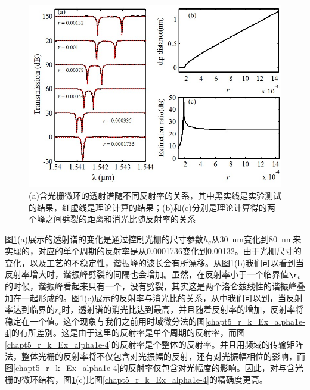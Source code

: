 \begin{figure}[htb]
	\centering
	\includegraphics[width=12cm]{./Pictures/chapt5_ring_grating_vary_reflector.jpg}
	\caption{(a)含光栅微环的透射谱随不同反射率的关系，其中黑实线是实验测试的结果，红虚线是理论计算的结果；(b)和(c)分别是理论计算得的两个峰之间劈裂的距离和消光比随反射率的关系}
	\label{chapt5_ring_grating_vary_reflector}
\end{figure}

图\ref{chapt5_ring_grating_vary_reflector}(a)展示的透射谱的变化是通过控制光栅的尺寸参数$h_g$从30~nm变化到80~nm来实现的，对应的单个周期的反射率是从0.0001736变化到0.00132。由于光栅尺寸的变化，以及工艺的不稳定性，谐振峰的波长会有所漂移。从图\ref{chapt5_ring_grating_vary_reflector}(b)我们可以看到当反射率增大时，谐振峰劈裂的间隔也会增加。虽然，在反射率小于一个临界值$\r_c$的时候，谐振峰看起来只有一个，没有劈裂，其实这是两个洛仑兹线性的谐振峰叠加在一起形成的。图\ref{chapt5_ring_grating_vary_reflector}(c)展示的反射率与消光比的关系，从中我们可以到，当反射率达到临界的$r_c$时，透射谱的消光比达到最高，并且随着反射率的增加，反射率将稳定在一个值。这个现象与我们之前用时域微分法的图\ref{chapt5_r_k_Ex_alpha1e-4}的有所差别。这是由于这里的反射率是单个周期的反射率，而图\ref{chapt5_r_k_Ex_alpha1e-4}的反射率是个整体的反射率。并且用频域的传输矩阵法，整体光栅的反射率将不仅包含对光振幅的反射，还有对光振幅相位的影响，而图\ref{chapt5_r_k_Ex_alpha1e-4}的反射率仅包含对光幅度的影响。因此，对与含光栅的微环结构，图\ref{chapt5_ring_grating_vary_reflector}(c)比图\ref{chapt5_r_k_Ex_alpha1e-4}的精确度更高。

